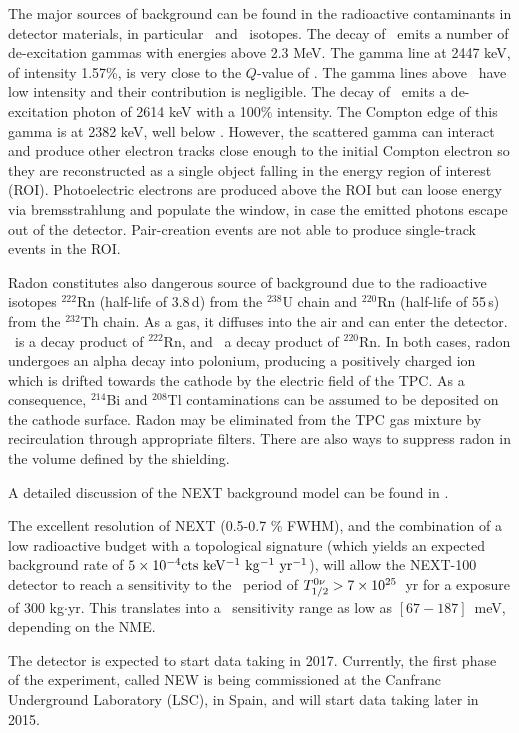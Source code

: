  The major sources of background can be found in the 
radioactive contaminants in detector materials, in particular \BI\ and \TL\ isotopes.
The decay of \BI\ emits a number of de-excitation gammas with energies above 2.3 MeV. The gamma line at 2447 keV, of intensity 1.57\%, is very close to the $Q$-value of \XE. The gamma lines above \Qbb\ have low intensity and their contribution is negligible. 
The decay of \TL\ emits a de-excitation photon of 2614 keV with a 100\% intensity. The Compton edge of this gamma is at 2382 keV, well below \Qbb. However, the scattered gamma can interact and produce other electron tracks close enough to the initial Compton electron so they are reconstructed as a single object falling in the energy region of interest (ROI). Photoelectric electrons are produced above the ROI but can loose energy via bremsstrahlung and populate the window, in case the emitted photons escape out of the detector. Pair-creation events are not able to produce single-track events in the ROI. 

Radon constitutes also dangerous source of background due to the radioactive isotopes $^{222}$Rn (half-life of 3.8\,d) from the $^{238}$U chain and $^{220}$Rn (half-life of 55\,s) from the $^{232}$Th chain. As a gas, it diffuses into the air and can enter the detector. \BI\ is a decay product of $^{222}$Rn, and \TL\ a decay product of $^{220}$Rn. In both cases, radon undergoes an alpha decay into polonium, producing a positively charged ion which is drifted towards the cathode by the electric field of the TPC.  As a consequence, $^{214}$Bi and $^{208}$Tl contaminations can be assumed to be deposited on the cathode surface. Radon may be eliminated from the TPC gas mixture by recirculation through appropriate filters. There are also ways to suppress radon in the volume defined by the shielding. 

A detailed discussion of the NEXT background model can be found in \cite{Nebot-Guinot:2014raa}.

The excellent resolution of NEXT (0.5-0.7 \% FWHM), and the combination of a low radioactive budget with a topological signature (which yields an expected background rate of $5 \times 10^{-4} \mathrm{cts~keV^{-1}~kg^{-1}~yr^{-1}}$), will allow the NEXT-100 detector to reach a sensitivity to the \bbonu\ period of $T_{1/2}^{0\nu} > 7 \times 10^{25}$~yr for a exposure of 300 kg$\cdot$yr. This translates into a \mbb\ sensitivity range as low as $[67-187]$~meV, depending on the NME.

The detector is expected to start data taking in 2017. Currently, the first phase of the experiment, called NEW is being commissioned at the Canfranc Underground Laboratory (LSC), in Spain, and will start data taking later in 2015.
 

